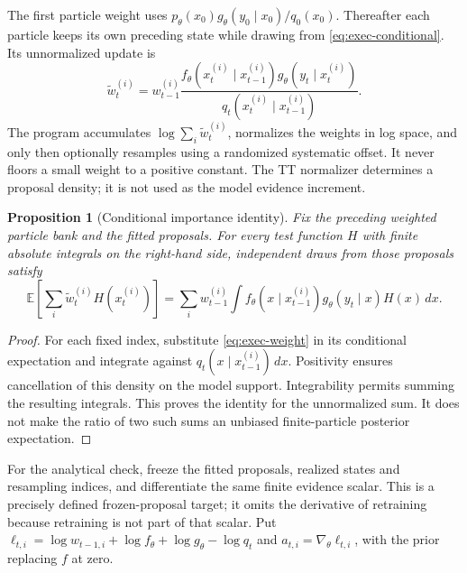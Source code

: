\documentclass[11pt]{article}
\newtheorem{proposition}{Proposition}
\begin{document}
The first particle weight uses $p_\theta(x_0)g_\theta(y_0\mid x_0)/q_0(x_0)$.
Thereafter each particle keeps its own preceding state while drawing from
\eqref{eq:exec-conditional}. Its unnormalized update is
\begin{equation}
 \widetilde w_t^{(i)}=w_{t-1}^{(i)}
 \frac{f_\theta(x_t^{(i)}\mid x_{t-1}^{(i)})
 g_\theta(y_t\mid x_t^{(i)})}{q_t(x_t^{(i)}\mid x_{t-1}^{(i)})}.
 \label{eq:exec-weight}
\end{equation}
The program accumulates $\log\sum_i\widetilde w_t^{(i)}$, normalizes the
weights in log space, and only then optionally resamples using a randomized
systematic offset. It never floors a small weight to a positive constant.
The TT normalizer determines a proposal density; it is not used as the model
evidence increment.

\begin{proposition}[Conditional importance identity]
\label{prop:exec-importance}
Fix the preceding weighted particle bank and the fitted proposals. For every
test function $H$ with finite absolute integrals on the right-hand side,
independent draws from those proposals satisfy
\begin{equation}
 \mathbb E\!\left[\sum_i\widetilde w_t^{(i)}H(x_t^{(i)})\right]
 =\sum_i w_{t-1}^{(i)}\int f_\theta(x\mid x_{t-1}^{(i)})
 g_\theta(y_t\mid x)H(x)\,dx.
 \label{eq:exec-importance-identity}
\end{equation}
\end{proposition}
\begin{proof}
For each fixed index, substitute \eqref{eq:exec-weight} in its conditional
expectation and integrate against $q_t(x\mid x_{t-1}^{(i)})\,dx$.
Positivity ensures cancellation of this density on the model support.
Integrability permits summing the resulting integrals. This proves the
identity for the unnormalized sum. It does not make the ratio of two such
sums an unbiased finite-particle posterior expectation.
\end{proof}

For the analytical check, freeze the fitted proposals, realized states and
resampling indices, and differentiate the same finite evidence scalar. This
is a precisely defined frozen-proposal target; it omits the derivative of
retraining because retraining is not part of that scalar. Put
$\ell_{t,i}=\log w_{t-1,i}+\log f_\theta+\log g_\theta-\log q_t$ and
$a_{t,i}=\nabla_\theta\ell_{t,i}$, with the prior replacing $f$ at zero.
\end{document}
